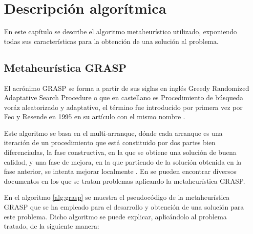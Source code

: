 
\chapter{Descripción algorítmica} %

\label{Chapter3}

En este capítulo se describe el algoritmo metaheurístico utilizado, exponiendo todas sus características para la obtención de una solución al problema.

\section{Metaheurística GRASP}
El acrónimo \gls{GRASP} se forma a partir de sus siglas en inglés Greedy Randomized Adaptative Search Procedure o que en castellano es Procedimiento de búsqueda voráz aleatorizado y adaptativo, el término fue introducido por primera vez por Feo y Resende en 1995 en su artículo con el mismo nombre \cite{grasp-feo-resende}.

Este algoritmo se basa en el multi-arranque, dónde cada arranque es una iteración de un procedimiento que está constituido por dos partes bien diferenciadas, la fase constructiva, en la que se obtiene una solución de buena calidad, y una fase de mejora, en la que partiendo de la solución obtenida en la fase anterior, se intenta mejorar localmente \cite{libro-metaheuristicas}. 
En \cite{grasp-flightrecoveryproblem} \cite{grasp-parallel} \cite{grasp-weapon} \cite{grasp-empaquetado} \cite{grasp-ruta} \cite{grasp-vertex} se pueden encontrar diversos documentos en los que se tratan problemas aplicando la metaheurística \gls{GRASP}.

En el algoritmo \ref{alg:grasp} se muestra el pseudocódigo de la metaheurística \gls{GRASP} que se ha empleado para el desarrollo y obtención de una solución para este problema. Dicho algoritmo se puede explicar, aplicándolo al problema tratado, de la siguiente manera:\\

